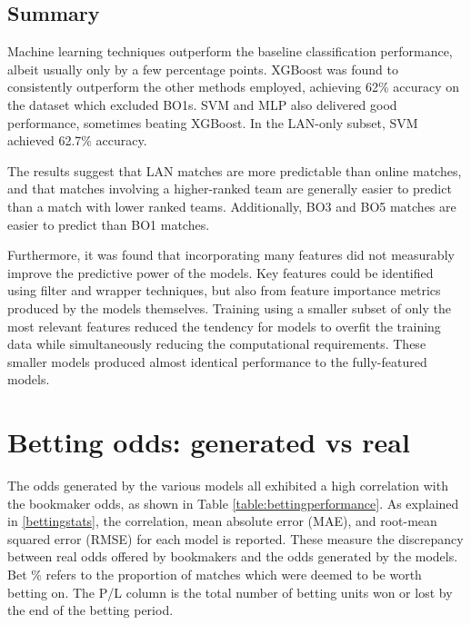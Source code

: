 \subsection{Summary}

Machine learning techniques outperform the baseline classification performance, albeit usually only by a few percentage points. XGBoost was found to consistently outperform the other methods employed, achieving 62\% accuracy on the dataset which excluded BO1s. SVM and MLP also delivered good performance, sometimes beating XGBoost. In the LAN-only subset, SVM achieved 62.7\% accuracy.

The results suggest that LAN matches are more predictable than online matches, and that matches involving a higher-ranked team are generally easier to predict than a match with lower ranked teams. Additionally, BO3 and BO5 matches are easier to predict than BO1 matches.

Furthermore, it was found that incorporating many features did not measurably improve the predictive power of the models. Key features could be identified using filter and wrapper techniques, but also from feature importance metrics produced by the models themselves. Training using a smaller subset of only the most relevant features reduced the tendency for models to overfit the training data while simultaneously reducing the computational requirements. These smaller models produced almost identical performance to the fully-featured models. 


\section{Betting odds: generated vs real}

The odds generated by the various models all exhibited a high correlation with the bookmaker odds, as shown in Table \ref{table:bettingperformance}. As explained in \ref{bettingstats}, the correlation, mean absolute error (MAE), and root-mean squared error (RMSE) for each model is reported. These measure the discrepancy between real odds offered by bookmakers and the odds generated by the models. Bet \% refers to the proportion of matches which were deemed to be worth betting on. The P/L column is the total number of betting units won or lost by the end of the betting period.

